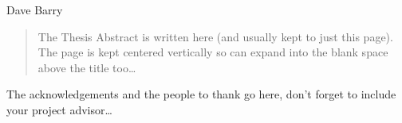 \documentclass[
11pt, %
english, %
onehalfspacing %
]{MastersDoctoralThesis} %
\begin{document}
\hfill Dave Barry


\begin{abstract}
\addchaptertocentry{\abstractname} %

The Thesis Abstract is written here (and usually kept to just this page). The page is kept centered vertically so can expand into the blank space above the title too\ldots

\end{abstract}


\begin{acknowledgements}
\addchaptertocentry{\acknowledgementname} %

The acknowledgements and the people to thank go here, don't forget to include your project advisor\ldots

\end{acknowledgements}


\tableofcontents %

\listoffigures %

\listoftables %

\end{document}
